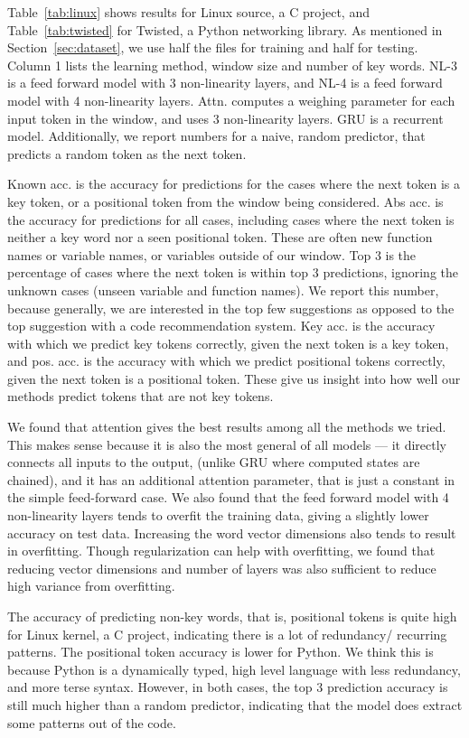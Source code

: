 \noindent
Table~\ref{tab:linux} shows results for Linux source, a C project, and
Table~\ref{tab:twisted} for Twisted, a Python networking library. As mentioned
in Section~\ref{sec:dataset}, we use half the files for training and half for
testing.
Column 1
lists the learning method, window size and number of key words.
NL-3 is a feed forward model with 3 non-linearity layers, and NL-4 is a feed
forward model with 4 non-linearity layers. Attn. computes a weighing
parameter for each input token in the window, and uses 3 non-linearity layers.
GRU is a recurrent model.
Additionally, we report numbers for a naive, random
predictor, that predicts a random token as the next token.

Known acc. is the
accuracy for predictions for the cases where the next token is a key token, or
a positional token from the window being considered. Abs acc. is the accuracy
for predictions for all cases, including cases where the next token is
neither a key word nor a seen positional token. These are often new function
names or variable names, or variables outside of our window. Top 3 is the
percentage of cases where the next token is within top 3 predictions, ignoring
the unknown cases (unseen variable and function names).
We report this number, because generally, we are interested in the top few
suggestions as opposed to the top suggestion with a code recommendation system.
Key acc. is the
accuracy with which we predict key tokens correctly, given the next token is a
key token,
and pos. acc. is the accuracy with which we predict positional tokens
correctly, given the next token is a positional token.
These give us insight into how well our methods predict tokens that are not key
tokens.

We found that attention gives the best results among all the methods we tried.
This makes sense because it is also the most general of all models --- it
directly connects all inputs to the output, (unlike GRU where computed states
are chained), and it has an additional attention parameter, that is just a
constant in the simple feed-forward case. We also found that the feed forward
model with 4 non-linearity layers tends to overfit the training data, giving a slightly
lower accuracy on test data. Increasing the word vector dimensions also tends
to result in overfitting. Though regularization can help with overfitting, we
found that reducing vector dimensions and number of layers was also sufficient
to reduce high variance from overfitting.

The accuracy of predicting non-key words, that is, positional tokens is quite
high for Linux kernel, a C project, indicating there is a lot of redundancy/
recurring patterns. The positional token accuracy is lower for Python.
We think this is because Python is a dynamically typed, high level
language with less redundancy, and more terse syntax.
However, in both cases, the top 3 prediction
accuracy is still much higher than a random predictor, indicating that the
model does extract some patterns out of the code.


